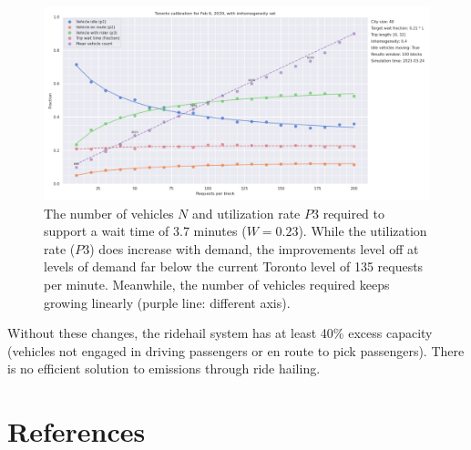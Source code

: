\documentclass[
  letterpaper,
]{article}
\begin{document}
\begin{figure}

{\centering \includegraphics[width=1\textwidth,height=\textheight]{wait_times.png}

}

\caption{\label{fig-7}The number of vehicles \(N\) and utilization rate
\(P3\) required to support a wait time of 3.7 minutes (\(W =0.23\)).
While the utilization rate (\(P3\)) does increase with demand, the
improvements level off at levels of demand far below the current Toronto
level of 135 requests per minute. Meanwhile, the number of vehicles
required keeps growing linearly (purple line: different axis).}

\end{figure}

Without these changes, the ridehail system has at least 40\% excess
capacity (vehicles not engaged in driving passengers or en route to pick
passengers). There is no efficient solution to emissions through ride
hailing.

\hypertarget{references}{%
\section*{References}\label{references}}
\end{document}
